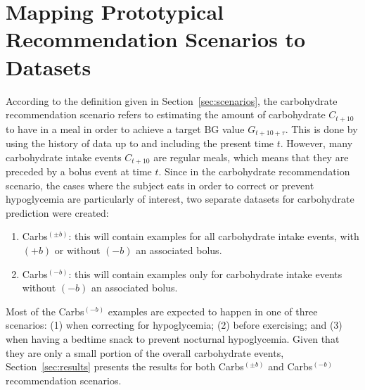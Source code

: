 \section{Mapping Prototypical Recommendation Scenarios to Datasets}
\label{sec:mapping}

According to the definition given in Section~\ref{sec:scenarios}, the carbohydrate recommendation scenario refers to estimating the amount of carbohydrate $C_{t+10}$ to have in a meal in order to achieve a target \ac{BG} value $G_{t+10+\tau}$. This is done by using the history of data up to and including the present time $t$. However, many carbohydrate intake events $C_{t+10}$ are regular meals, which means that they are preceded by a bolus event at time $t$. Since in the carbohydrate recommendation scenario, the cases where the subject eats in order to correct or prevent hypoglycemia are particularly of interest, two separate datasets for carbohydrate prediction were created:
\begin{enumerate}
    \item Carbs$^{(\pm b)}$: this will contain examples for all carbohydrate intake events, with $(+b)$ or without $(-b)$ an associated bolus.
    \item Carbs$^{(-b)}$: this will contain examples only for carbohydrate intake events without $(-b)$ an associated bolus.
\end{enumerate}
Most of the Carbs$^{(-b)}$ examples are expected to happen in one of three scenarios: (1) when correcting for hypoglycemia; (2) before exercising; and (3) when having a bedtime snack to prevent nocturnal hypoglycemia. Given that they are only a small portion of the overall carbohydrate events, Section~\ref{sec:results} presents the results for both Carbs$^{(\pm b)}$ and Carbs$^{(-b)}$ recommendation scenarios.

